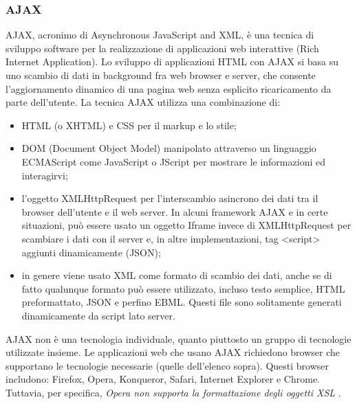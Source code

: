 \subsubsection{AJAX}
AJAX, acronimo di Asynchronous JavaScript and XML, è una tecnica di sviluppo software per la realizzazione di applicazioni web interattive (Rich Internet Application). Lo sviluppo di applicazioni HTML con AJAX si basa su uno scambio di dati in background fra web browser e server, che consente l'aggiornamento dinamico di una pagina web senza esplicito ricaricamento da parte dell'utente.
\newline
La tecnica AJAX utilizza una combinazione di:
\begin{itemize}
	\item HTML (o XHTML) e CSS per il markup e lo stile;
	\item DOM (Document Object Model) manipolato attraverso un linguaggio ECMAScript come JavaScript o JScript per mostrare le informazioni ed interagirvi;
	\item l'oggetto XMLHttpRequest per l'interscambio asincrono dei dati tra il browser dell'utente e il web server. In alcuni framework AJAX e in certe situazioni, può essere usato un oggetto Iframe invece di XMLHttpRequest per scambiare i dati con il server e, in altre implementazioni, tag <script> aggiunti dinamicamente (JSON);
	\item in genere viene usato XML come formato di scambio dei dati, anche se di fatto qualunque formato può essere utilizzato, incluso testo semplice, HTML preformattato, JSON e perfino EBML. Questi file sono solitamente generati dinamicamente da script lato server. 
\end{itemize}
AJAX non è una tecnologia individuale, quanto piuttosto un gruppo di tecnologie utilizzate insieme.
\newline
Le applicazioni web che usano AJAX richiedono browser che supportano le tecnologie necessarie (quelle dell'elenco sopra). \newline Questi browser includono: Firefox, Opera, Konqueror, Safari, Internet Explorer e Chrome. Tuttavia, per specifica, \textit{Opera non supporta la formattazione degli oggetti XSL} \cite{sito_Ajax}.
